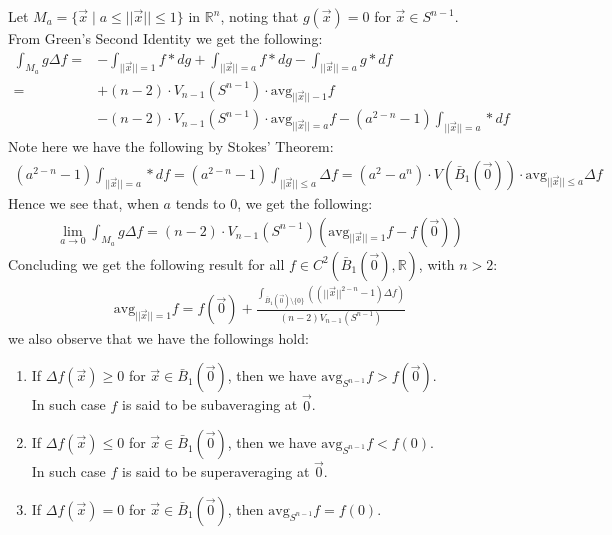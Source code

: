 \documentclass[15pt]{book}
\theoremstyle{break}
\theoremstyle{break}
\newcommand{\R}{\mathbb{R}}
\begin{document}
Let $M_a = \{ \vec{x} \mid a\leq ||\vec{x}|| \leq 1\}$ in $\R^n$, noting that $g(\vec{x})= 0$ for $\vec{x} \in S^{n-1}$.\\
From Green's Second Identity we get the following:
\begin{align*}
\int_{M_a} g\Delta f 
=& -\int_{||\vec{x}|| = 1}f*dg + \int_{||\vec{x}|| = a} f*dg - \int_{||\vec{x}|| = a}g*df \\
=& +(n-2) \cdot V_{n-1}(S^{n-1}) \cdot \text{avg}_{||\vec{x}||-1} f \\
&- (n-2)\cdot V_{n-1}(S^{n-1})\cdot {\text{avg}}_{||\vec{x}|| = a}f - (a^{2-n}-1)\int_{||\vec{x}|| = a}*df 
\end{align*}
Note here we have the following by Stokes' Theorem:
\begin{align*}
 (a^{2-n}-1)\int_{||\vec{x}|| = a}*df =  (a^{2-n}-1)\int_{||\vec{x}|| \leq a}\Delta f  = (a^2 -a^n) \cdot V(\bar{B}_1(\vec{0}))\cdot \text{avg}_{||\vec{x}|| \leq a} \Delta f 
\end{align*}
Hence we see that, when $a$ tends to $0$, we get the following:
\begin{align*}
\lim_{a \to 0} \int_{M_a} g\Delta f = (n-2)\cdot V_{n-1}(S^{n-1}) \left( \text{avg}_{||\vec{x}|| = 1} f - f(\vec{0})\right)
\end{align*}
Concluding we get the following result for all $f \in C^2(\bar{B}_1(\vec{0}),\R)$, with $n >2$:
\begin{align*}
\text{avg}_{||\vec{x}||=1}f = f(\vec{0}) + \frac{\int_{\bar{B}_1(\vec{0})\setminus \{0\}} \left((||\vec{x}||^{2-n}-1)\Delta f\right)}{(n-2) V_{n-1}(S^{n-1})}
\end{align*}
we also observe that we have the followings hold:
\begin{enumerate}[topsep=3pt,itemsep=-1ex,partopsep=1ex,parsep=1ex]
\item If $\Delta f(\vec{x}) \geq 0$ for $\vec{x}\in \bar{B}_1(\vec{0})$, then we have $\text{avg}_{S^{n-1}} f > f(\vec{0})$.\\
 In such case $f$ is said to be subaveraging at $\vec{0}$.
\item If $\Delta f(\vec{x}) \leq 0$ for $\vec{x}\in \bar{B}_1(\vec{0})$, then we have $\text{avg}_{S^{n-1}} f < f(0)$. \\
 In such case $f$ is said to be superaveraging at $\vec{0}$.
\item If $\Delta f(\vec{x})= 0$ for $\vec{x}\in \bar{B}_1(\vec{0})$, then $\text{avg}_{S^{n-1}} f = f(0)$.
\end{enumerate}
\end{document}
